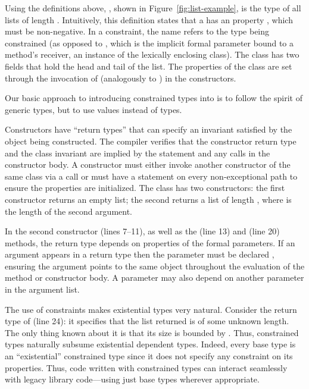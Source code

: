 Using the definitions above, , shown in
Figure~\ref{fig:list-example}, is the type of all lists of
length .
%
Intuitively, this definition states that a  has an 
property , which must be non-negative.
In a constraint, the name  refers to the type being
constrained (as opposed to , which is the implicit
formal parameter bound to a method's receiver,
an instance of the lexically enclosing class).
The class has two
fields that hold the head and tail of the list.  The properties
of the
class are set through the invocation of \tcd{(\ldots)}
(analogously to \tcd{(\ldots)}) in the constructors.

Our basic approach to introducing constrained types into \Xten{}
is to follow the spirit of generic types, but to use values
instead of types.

Constructors have ``return
types'' that can specify an invariant satisfied by the object being
constructed.  The compiler verifies that the
constructor return type and the class invariant are implied by the
 statement and any  calls in the constructor
body.
A constructor must either invoke another constructor of the same
class via a
 call
or must have a  statement on every
non-exceptional path
to ensure the properties are initialized.
The  class has two constructors: the first
constructor returns an empty list;
the second
returns a list of length , where  is the length
of the second argument. 

In the second constructor (lines 7--11), as well as 
the  (line 13) and  (line 20) methods,
the return type
depends on properties of the formal parameters. 
If an argument appears in a
return type then the parameter must be declared ,
ensuring the
argument points to the same object throughout the evaluation of
the method or constructor body.  A parameter may also depend on
another parameter in the argument list.

The use of constraints makes existential types very natural.
Consider the return type of  (line 24): it specifies
that the list returned is of some unknown length. The only thing
known about it is that its size is bounded by .
Thus,
constrained types naturally subsume existential dependent types.
Indeed, every base type  is an ``existential''
constrained type since it does not specify any constraint on its
properties. Thus, code written with constrained types can
interact seamlessly with legacy library code---using just base
types wherever appropriate.

